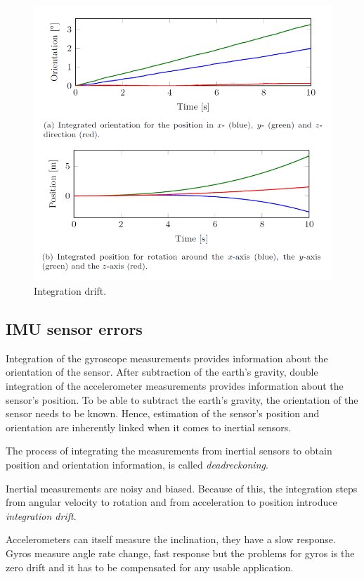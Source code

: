 \documentclass{article}
\begin{document}
\begin{figure}[t]
  \includegraphics[width=1\linewidth]{images/integration_drift.png}
  \caption[]{Integration drift.}
  \label{fig:IntegrationDrift}
\end{figure}

\subsection{IMU sensor errors}

Integration of the gyroscope measurements provides information about the orientation of the sensor. After subtraction of the earth's gravity, double integration of the accelerometer measurements provides information about the sensor's position. To be able to subtract the earth's gravity, the orientation of the sensor needs to be known. Hence, estimation of the sensor's position and orientation are inherently linked when it comes to inertial sensors.

The process of integrating the measurements from inertial sensors to obtain position and orientation information, is called \textit{deadreckoning}.

Inertial measurements are noisy and biased. Because of this, the integration steps from angular velocity to rotation and from acceleration to position introduce \textit{integration drift}.

Accelerometers can itself measure the inclination, they have a slow response. Gyros measure angle rate change, fast response but the problems for gyros is the zero drift and it has to be compensated for any usable application.
\end{document}
